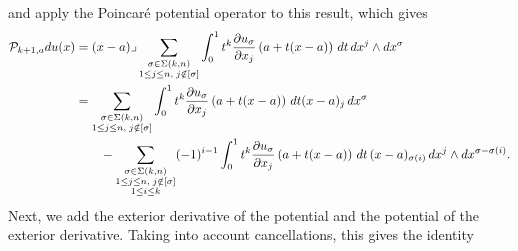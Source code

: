 \documentclass[10pt,a4paper]{article}
\begin{document}
and apply the Poincar\'e potential operator to this result, which gives 
\begin{align*}
    {\mathcal P}_{k+1,a} d u(x)
    &=
    (x-a)\lrcorner 
    \sum_{\substack{ \sigma \in \Sigma(k,n) \\ 1 \leq j \leq n, \; j \notin [\sigma] }}
    \int_{0}^{1} t^{k} \frac{ \partial u_{\sigma} }{\partial x_{j}}\left(a+t(x-a)\right) \,dt 
    \,dx^{j} \wedge dx^{\sigma}
    \\&
    = 
    \sum_{\substack{ \sigma \in \Sigma(k,n) \\ 1 \leq j \leq n, \; j \notin [\sigma] }} 
    \int_{0}^{1} t^{k} \frac{ \partial u_{\sigma} }{\partial x_{j}}\left(a+t(x-a)\right) \,dt (x-a)_{j}
    \,dx^{\sigma} 
    \\&\qquad 
    - 
    \sum_{\substack{ \sigma \in \Sigma(k,n) \\ 1 \leq j \leq n, \; j \notin [\sigma] \\ 1 \leq i \leq k }}
    (-1)^{i-1}
    \int_{0}^{1} t^{k} \frac{ \partial u_{\sigma} }{\partial x_{j}}\left(a+t(x-a)\right) \,dt 
    \,(x-a)_{\sigma(i)} 
    \,dx^{j} \wedge dx^{\sigma-\sigma(i)}
    .
\end{align*}
Next, we add the exterior derivative of the potential and the potential of the exterior derivative.
Taking into account cancellations, this gives the identity 
\begingroup\allowdisplaybreaks
\end{document}
